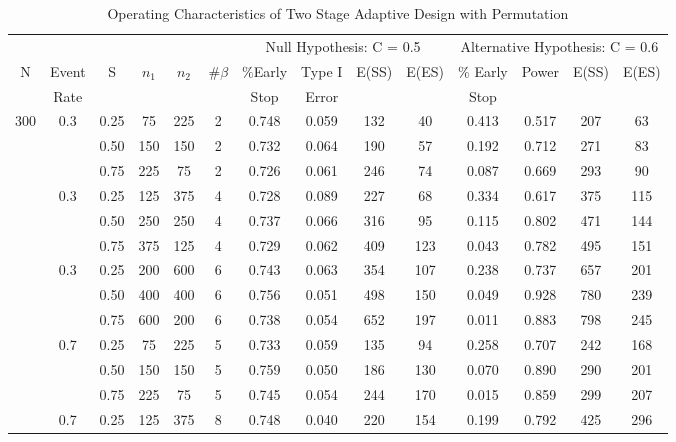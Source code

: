 
\begin{table}

\setlength{\tabcolsep}{3pt}

\caption{\label{tab:}Operating Characteristics of Two Stage Adaptive Design with Permutation}
\scriptsize
\centering
\begin{tabular}[t]{cccccccccccccc}
\toprule
 & & & & & & \multicolumn{4}{c}{Null Hypothesis: C = 0.5} & \multicolumn{4}{c}{Alternative Hypothesis: C = 0.6} \\ \cmidrule(lr){7-10} \cmidrule(lr){11-14}
N & Event & S & $n_1$ & $n_2$ & $\#\beta$ & $\%$Early & Type I & E(SS) & E(ES) & $\%$ Early& Power & E(SS) & E(ES)\\
 & Rate& & & & & Stop & Error & & &Stop & & &\\
\midrule
300 & 0.3 & 0.25 & 75 & 225 & 2 & 0.748 & 0.059 & 132 & 40 & 0.413 & 0.517 & 207 & 63\\
 &  & 0.50 & 150 & 150 & 2 & 0.732 & 0.064 & 190 & 57  & 0.192 & 0.712 & 271 & 83\\
 &  & 0.75 & 225 & 75 & 2 & 0.726 & 0.061 & 246 & 74  & 0.087 & 0.669 & 293 & 90\\
\addlinespace
500 & 0.3 & 0.25 & 125 & 375 & 4 & 0.728 & 0.089 & 227 & 68  & 0.334 & 0.617 & 375 & 115\\
 &  & 0.50 & 250 & 250 & 4 & 0.737 & 0.066 & 316 & 95  & 0.115 & 0.802 & 471 & 144\\
 &  & 0.75 & 375 & 125 & 4 & 0.729 & 0.062 & 409 & 123  & 0.043 & 0.782 & 495 & 151\\
\addlinespace
800 & 0.3 & 0.25 & 200 & 600 & 6 & 0.743 & 0.063 & 354 & 107  & 0.238 & 0.737 & 657 & 201\\
 &  & 0.50 & 400 & 400 & 6 & 0.756 & 0.051 & 498 & 150 &  0.049 & 0.928 & 780 & 239\\
 &  & 0.75 & 600 & 200 & 6 & 0.738 & 0.054 & 652 & 197 &  0.011 & 0.883 & 798 & 245\\
\addlinespace
300 & 0.7 & 0.25 & 75 & 225 & 5 & 0.733 & 0.059 & 135 & 94 &  0.258 & 0.707 & 242 & 168\\
 &  & 0.50 & 150 & 150 & 5 & 0.759 & 0.050 & 186 & 130 &  0.070 & 0.890 & 290 & 201\\
 &  & 0.75 & 225 & 75 & 5 & 0.745 & 0.054 & 244 & 170 &  0.015 & 0.859 & 299 & 207\\
\addlinespace
500 & 0.7 & 0.25 & 125 & 375 & 8 & 0.748 & 0.040 & 220 & 154  & 0.199 & 0.792 & 425 & 296\\

\end{tabular}
\end{table}
